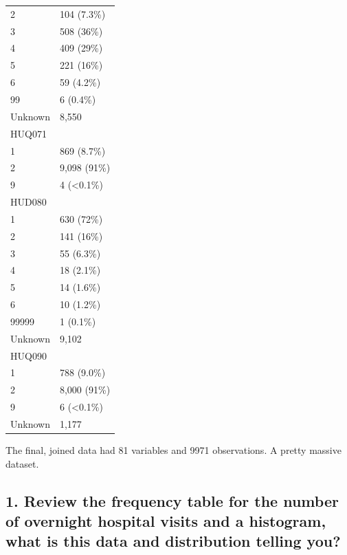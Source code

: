 \documentclass[]{article}
\begin{document}
\begin{longtable}[]{@{}ll@{}}
2 & 104 (7.3\%)\tabularnewline
3 & 508 (36\%)\tabularnewline
4 & 409 (29\%)\tabularnewline
5 & 221 (16\%)\tabularnewline
6 & 59 (4.2\%)\tabularnewline
99 & 6 (0.4\%)\tabularnewline
Unknown & 8,550\tabularnewline
HUQ071 &\tabularnewline
1 & 869 (8.7\%)\tabularnewline
2 & 9,098 (91\%)\tabularnewline
9 & 4 (\textless0.1\%)\tabularnewline
HUD080 &\tabularnewline
1 & 630 (72\%)\tabularnewline
2 & 141 (16\%)\tabularnewline
3 & 55 (6.3\%)\tabularnewline
4 & 18 (2.1\%)\tabularnewline
5 & 14 (1.6\%)\tabularnewline
6 & 10 (1.2\%)\tabularnewline
99999 & 1 (0.1\%)\tabularnewline
Unknown & 9,102\tabularnewline
HUQ090 &\tabularnewline
1 & 788 (9.0\%)\tabularnewline
2 & 8,000 (91\%)\tabularnewline
9 & 6 (\textless0.1\%)\tabularnewline
Unknown & 1,177\tabularnewline
\bottomrule
\end{longtable}

The final, joined data had 81 variables and 9971 observations. A pretty
massive dataset.

\hypertarget{review-the-frequency-table-for-the-number-of-overnight-hospital-visits-and-a-histogram-what-is-this-data-and-distribution-telling-you}{%
\subsection{1. Review the frequency table for the number of overnight
hospital visits and a histogram, what is this data and distribution
telling
you?}\label{review-the-frequency-table-for-the-number-of-overnight-hospital-visits-and-a-histogram-what-is-this-data-and-distribution-telling-you}}
\end{document}
